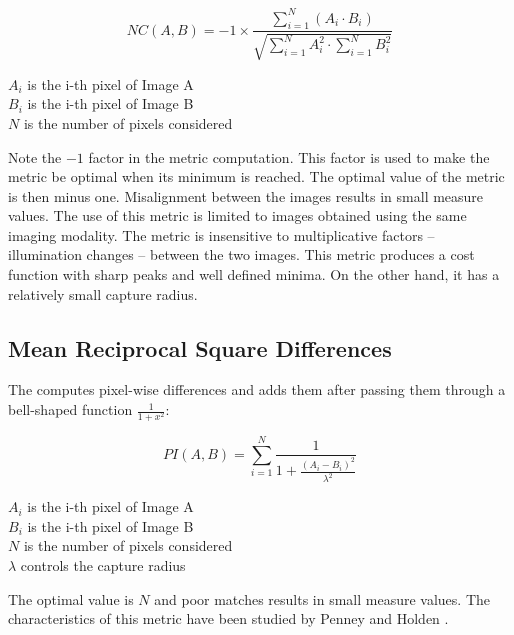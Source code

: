 \begin{equation}
NC(A,B) = -1 \times \frac{ \sum_{i=1}^N \left( A_i \cdot B_i \right) }
        { \sqrt { \sum_{i=1}^N A_i^2  \cdot \sum_{i=1}^N B_i^2 } }
\end{equation}
\begin{center}
$A_i$ is the i-th pixel of Image A\\ 
$B_i$ is the i-th pixel of Image B\\
$N$ is the number of pixels considered
\end{center}

Note the $-1$ factor in the metric computation. This factor is used to make the
metric be optimal when its minimum is reached.  The optimal value of the metric
is then minus one. Misalignment between the images results in small measure
values.  The use of this metric is limited to images obtained using the same
imaging modality.  The metric is insensitive to multiplicative factors
-- illumination changes -- between
the two images.  This metric produces a cost function with sharp peaks and well
defined minima.  On the other hand, it has a relatively small capture radius.

\subsection{Mean Reciprocal Square Differences}
\label{sec:MeanReciprocalSquareDifferenceMetric}

The  computes
pixel-wise differences and adds them after passing them through a bell-shaped
function $\frac{1}{1+x^2}$:

\begin{equation}
PI(A,B) =  \sum_{i=1}^N \frac{ 1 }{ 1 + \frac{ \left( A_i - B_i \right) ^ 2}{ \lambda^2 }  }
\end{equation}
\begin{center}
$A_i$ is the i-th pixel of Image A \\
$B_i$ is the i-th pixel of Image B \\
$N$ is the number of pixels considered \\
$\lambda$ controls the capture radius
\end{center}

The optimal value is $N$ and poor matches results in small measure values.
The characteristics of this metric have been studied by Penney and Holden
\cite{Holden1999}\cite{Penney1998}.

